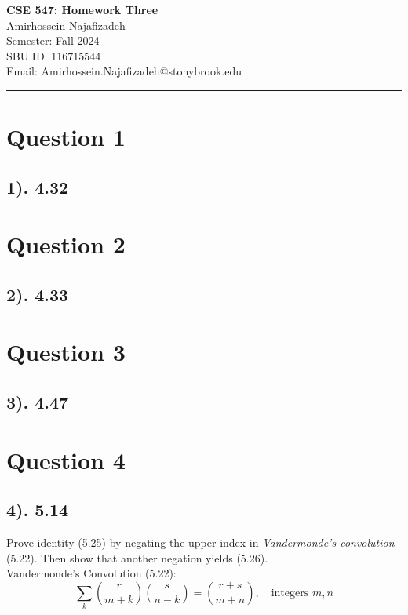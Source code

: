 \documentclass[12pt]{article}
\begin{document}
\begin{center}
    {\LARGE\textbf{CSE 547: Homework Three}} \\[1em]
    {\large Amirhossein Najafizadeh} \\[1em]
    Semester: Fall 2024 \\ 
    SBU ID: 116715544 \\
    Email: Amirhossein.Najafizadeh@stonybrook.edu \\[1em]
    \noindent\rule{\textwidth}{0.6pt}
\end{center}

\section*{Question 1}
\subsection*{1). 4.32}

\section*{Question 2}
\subsection*{2). 4.33}

\section*{Question 3}
\subsection*{3). 4.47}

\section*{Question 4}
\subsection*{4). 5.14}
Prove identity (5.25) by negating the upper index in \textit{Vandermonde's convolution} (5.22). Then show that another negation yields (5.26). \\

Vandermonde's Convolution (5.22):
\begin{equation}
    \sum_{k} \binom{r}{m+k} \binom{s}{n-k} = \binom{r+s}{m+n}, \quad \text{integers } m, n
\end{equation}
\end{document}
